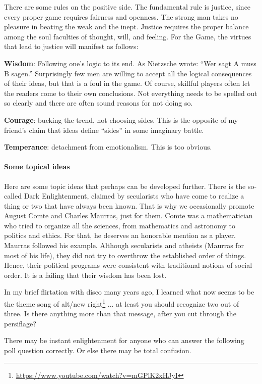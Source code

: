 There are some rules on the positive side. The fundamental rule is justice, since every proper game requires fairness and openness. The strong man takes no pleasure in beating the weak and the inept. Justice requires the proper balance among the soul faculties of thought, will, and feeling. For the Game, the virtues that lead to justice will manifest as follows:

\textbf{Wisdom}: Following one's logic to its end. As Nietzsche wrote: ``Wer sagt A muss B sagen.'' Surprisingly few men are willing to accept all the logical consequences of their ideas, but that is a foul in the game. Of course, skillful players often let the readers come to their own conclusions. Not everything needs to be spelled out so clearly and there are often sound reasons for not doing so.

\textbf{Courage}: bucking the trend, not choosing sides. This is the opposite of my friend's claim that ideas define ``sides'' in some imaginary battle.

\textbf{Temperance}: detachment from emotionalism. This is too obvious.


\paragraph{Some topical ideas}


Here are some topic ideas that perhaps can be developed further. There is the so-called Dark Enlightenment, claimed by secularists who have come to realize a thing or two that have always been known. That is why we occasionally promote August Comte and Charles Maurras, just for them. Comte was a mathematician who tried to organize all the sciences, from mathematics and astronomy to politics and ethics. For that, he deserves an honorable mention as a player. Maurras followed his example. Although secularists and atheists (Maurras for most of his life), they did not try to overthrow the established order of things. Hence, their political programs were consistent with traditional notions of social order. It is a failing that their wisdom has been lost.

In my brief flirtation with disco many years ago, I learned what now seems to be the theme song of alt/new right\footnote{\url{https://www.youtube.com/watch?v=mGPlK2xHJyI}} ... at least you should recognize two out of three. Is there anything more than that message, after you cut through the persiflage?

There may be instant enlightenment for anyone who can answer the following poll question correctly. Or else there may be total confusion.


